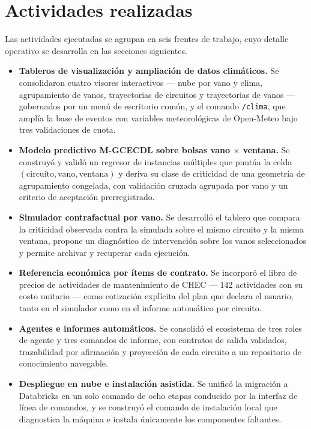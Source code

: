 \documentclass[11pt,a4paper]{article}
\begin{document}
\section{Actividades realizadas}

Las actividades ejecutadas se agrupan en seis frentes de trabajo, cuyo detalle operativo se
desarrolla en las secciones siguientes.

\begin{itemize}
  \item \textbf{Tableros de visualización y ampliación de datos climáticos.} Se
        consolidaron cuatro visores interactivos --- nube por vano y clima, agrupamiento de
        vanos, trayectorias de circuitos y trayectorias de vanos --- gobernados por un menú
        de escritorio común, y el comando \texttt{/clima}, que amplía la base de eventos con
        variables meteorológicas de Open-Meteo bajo tres validaciones de cuota.

  \item \textbf{Modelo predictivo M-GCECDL sobre bolsas vano $\times$ ventana.} Se construyó
        y validó un regresor de instancias múltiples que puntúa la celda
        $(\text{circuito}, \text{vano}, \text{ventana})$ y deriva su clase de criticidad de
        una geometría de agrupamiento congelada, con validación cruzada agrupada por vano y
        un criterio de aceptación prerregistrado.

  \item \textbf{Simulador contrafactual por vano.} Se desarrolló el tablero que compara la
        criticidad observada contra la simulada sobre el mismo circuito y la misma ventana,
        propone un diagnóstico de intervención sobre los vanos seleccionados y permite
        archivar y recuperar cada ejecución.

  \item \textbf{Referencia económica por ítems de contrato.} Se incorporó el libro de precios
        de actividades de mantenimiento de CHEC --- 142 actividades con su costo unitario ---
        como cotización explícita del plan que declara el usuario, tanto en el simulador como
        en el informe automático por circuito.

  \item \textbf{Agentes e informes automáticos.} Se consolidó el ecosistema de tres roles de
        agente y tres comandos de informe, con contratos de salida validados, trazabilidad
        por afirmación y proyección de cada circuito a un repositorio de conocimiento
        navegable.

  \item \textbf{Despliegue en nube e instalación asistida.} Se unificó la migración a
        Databricks en un solo comando de ocho etapas conducido por la interfaz de línea de
        comandos, y se construyó el comando de instalación local que diagnostica la máquina e
        instala únicamente los componentes faltantes.
\end{itemize}
\end{document}
